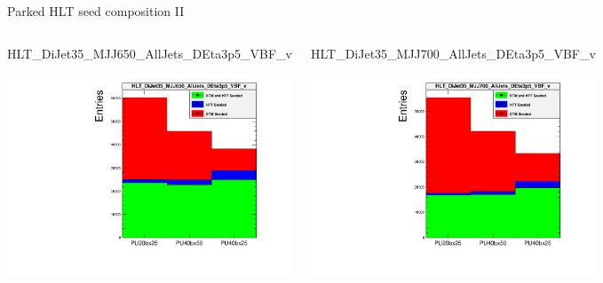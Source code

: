 \documentclass[8pt]{beamer}
\begin{document}
\begin{frame}{Parked HLT seed composition II}

\begin{columns}
 
\begin{block}{\footnotesize HLT\_DiJet35\_MJJ650\_AllJets\_DEta3p5\_VBF\_v}
\centering

\includegraphics[width=\linewidth]{fig/HLT_DiJet35_MJJ650_AllJets_DEta3p5_VBF_v.pdf}

\end{block}
  
\begin{block}{\footnotesize HLT\_DiJet35\_MJJ700\_AllJets\_DEta3p5\_VBF\_v}
\centering

\includegraphics[width=\linewidth]{fig/HLT_DiJet35_MJJ700_AllJets_DEta3p5_VBF_v.pdf}

\end{block}

\end{columns}

\end{frame}
\end{document}
